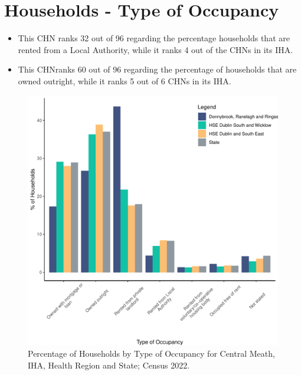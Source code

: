\documentclass{article}
\begin{document}
\section{Households - Type of Occupancy}\label{sect:Households}
\begin{itemize}
\item This CHN ranks  32 out of 96 regarding the percentage households that are rented from a Local Authority, while it ranks  4 out of the CHNs in its IHA. 
\item This CHNranks  60 out of 96 regarding the percentage of households that are owned outright, while it ranks   5 out of 6 CHNs in its IHA.
\end{itemize}
\begin{figure}[H]
	\centering
	\includegraphics[width = 140mm]{../figures/HouseholdsED.pdf}
	\caption{Percentage of Households by Type of Occupancy for Central Meath, IHA, Health Region and State; Census 2022.}
	\label{fig:vbnv}
	\end{figure}
\end{document}
